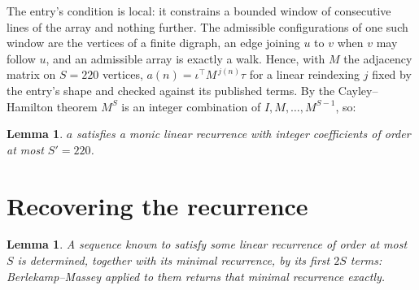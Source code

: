 \documentclass[11pt,a4paper]{article}
\theoremstyle{plain}
\newtheorem{lemma}[theorem]{Lemma}
\theoremstyle{definition}
\begin{document}
The entry's condition is local: it constrains a bounded window of consecutive lines of the
array and nothing further. The admissible configurations of one such window are the vertices
of a finite digraph, an edge joining $u$ to $v$ when $v$ may follow $u$, and an admissible
array is exactly a walk. Hence, with $M$ the adjacency matrix on $S=220$ vertices,
$a(n)=\iota^{\!\top}M^{\,j(n)}\tau$ for a linear reindexing $j$ fixed by the entry's shape
and checked against its published terms. By the Cayley--Hamilton theorem $M^{S}$ is an
integer combination of $I,M,\dots,M^{S-1}$, so:

\begin{lemma}\label{lem:cf}
$a$ satisfies a monic linear recurrence with integer coefficients of order at most
$S'=220$.
\end{lemma}

\section{Recovering the recurrence}

\begin{lemma}\label{lem:bm}
A sequence known to satisfy some linear recurrence of order at most $S$ is determined, together
with its minimal recurrence, by its first $2S$ terms: Berlekamp--Massey applied to them returns
that minimal recurrence exactly.
\end{lemma}
\end{document}
